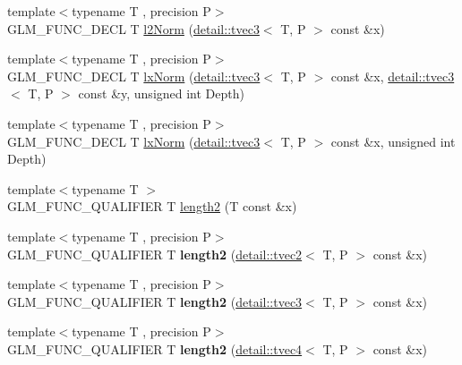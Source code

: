 \begin{DoxyCompactItemize}
\item 
{\footnotesize template$<$typename T , precision P$>$ }\\G\-L\-M\-\_\-\-F\-U\-N\-C\-\_\-\-D\-E\-C\-L T \hyperlink{group__gtx__norm_gacdfd8d645b91db95a191a1294226571b}{l2\-Norm} (\hyperlink{structglm_1_1detail_1_1tvec3}{detail\-::tvec3}$<$ T, P $>$ const \&x)
\item 
{\footnotesize template$<$typename T , precision P$>$ }\\G\-L\-M\-\_\-\-F\-U\-N\-C\-\_\-\-D\-E\-C\-L T \hyperlink{group__gtx__norm_gaf2ec2a2b14e0d4ddfadd5b1a98ed9799}{lx\-Norm} (\hyperlink{structglm_1_1detail_1_1tvec3}{detail\-::tvec3}$<$ T, P $>$ const \&x, \hyperlink{structglm_1_1detail_1_1tvec3}{detail\-::tvec3}$<$ T, P $>$ const \&y, unsigned int Depth)
\item 
{\footnotesize template$<$typename T , precision P$>$ }\\G\-L\-M\-\_\-\-F\-U\-N\-C\-\_\-\-D\-E\-C\-L T \hyperlink{group__gtx__norm_ga7f76252fa0266db34865dba8a8c0f7d6}{lx\-Norm} (\hyperlink{structglm_1_1detail_1_1tvec3}{detail\-::tvec3}$<$ T, P $>$ const \&x, unsigned int Depth)
\item 
{\footnotesize template$<$typename T $>$ }\\G\-L\-M\-\_\-\-F\-U\-N\-C\-\_\-\-Q\-U\-A\-L\-I\-F\-I\-E\-R T \hyperlink{group__gtx__norm_ga08c670024cd230e22f8b853f185ff533}{length2} (T const \&x)
\item 
\hypertarget{namespaceglm_ac3840f0dc5178071efeb9c431dcdf230}{{\footnotesize template$<$typename T , precision P$>$ }\\G\-L\-M\-\_\-\-F\-U\-N\-C\-\_\-\-Q\-U\-A\-L\-I\-F\-I\-E\-R T {\bfseries length2} (\hyperlink{structglm_1_1detail_1_1tvec2}{detail\-::tvec2}$<$ T, P $>$ const \&x)}\label{namespaceglm_ac3840f0dc5178071efeb9c431dcdf230}

\item 
\hypertarget{namespaceglm_acd4e0b768adff0710d0c59aed356d837}{{\footnotesize template$<$typename T , precision P$>$ }\\G\-L\-M\-\_\-\-F\-U\-N\-C\-\_\-\-Q\-U\-A\-L\-I\-F\-I\-E\-R T {\bfseries length2} (\hyperlink{structglm_1_1detail_1_1tvec3}{detail\-::tvec3}$<$ T, P $>$ const \&x)}\label{namespaceglm_acd4e0b768adff0710d0c59aed356d837}

\item 
\hypertarget{namespaceglm_a5b1d668b8ffd3ec2423ef18e260c2cce}{{\footnotesize template$<$typename T , precision P$>$ }\\G\-L\-M\-\_\-\-F\-U\-N\-C\-\_\-\-Q\-U\-A\-L\-I\-F\-I\-E\-R T {\bfseries length2} (\hyperlink{structglm_1_1detail_1_1tvec4}{detail\-::tvec4}$<$ T, P $>$ const \&x)}\label{namespaceglm_a5b1d668b8ffd3ec2423ef18e260c2cce}


\end{DoxyCompactItemize}
